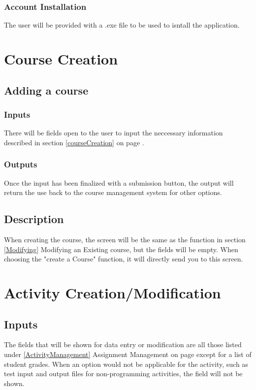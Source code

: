 \documentclass{article}
\begin{document}
\subsubsection{Account Installation}
The user will be provided with a .exe file to be used to isntall the application.

\section{Course Creation}

\subsection{Adding a course}
\subsubsection{Inputs}
There will be fields open to the user to input the neccessary information described
in section \ref{courseCreation} on page \pageref{courseCreation}.
\subsubsection{Outputs}
Once the input has been finalized with a submission button, the output will return the use back to the course management system for other options.
\subsection{Description}
When creating the course, the screen will be the same as the function in section \ref{Modifying} Modifying an Existing course, but the fields will be empty. When choosing the "create a Course" function, it will directly send you to this screen.


\section{Activity Creation/Modification}
\subsection{Inputs}
The fields that will be shown for data entry or modification are all those listed
under \ref{ActivityManagement} Assignment Management on page \pageref{ActivityManagement} except for a list of student grades.
When an option would not be applicable for the activity, such as test input and output files
for non-programming activities, the field will not be shown.
\end{document}
